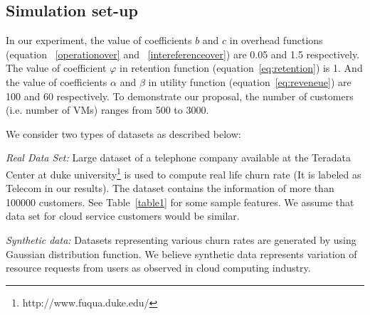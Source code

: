 
\subsection{Simulation set-up}
In our experiment, the value of coefficients $b$ and $c$ in overhead functions (equation ~\ref{operationover} and ~\ref{intereferenceover}) are 0.05 and 1.5 respectively. The value of coefficient $\varphi$  in retention function (equation~\ref{eq:retention}) is 1. And the value of coefficients $\alpha$ and $\beta$ in utility function (equation~\ref{eq:reveneue})   are 100 and 60 respectively.
To demonstrate our proposal, the number of customers (i.e. number of VMs) ranges from 500 to 3000. 

We consider two types of datasets as described below:

\textit{Real Data Set:} Large dataset of a telephone company available at the Teradata Center at duke university\footnote{http://www.fuqua.duke.edu/} is used to compute real life churn rate (It is labeled as Telecom in our results). The dataset contains the information of more than 100000 customers. See Table~\ref{table1} for some sample features. We assume that data set for cloud service customers would be similar. 
 
\textit{Synthetic data:} Datasets representing various churn rates are generated by using Gaussian distribution function. We believe synthetic data represents variation of resource requests from users as observed in cloud computing industry.  



